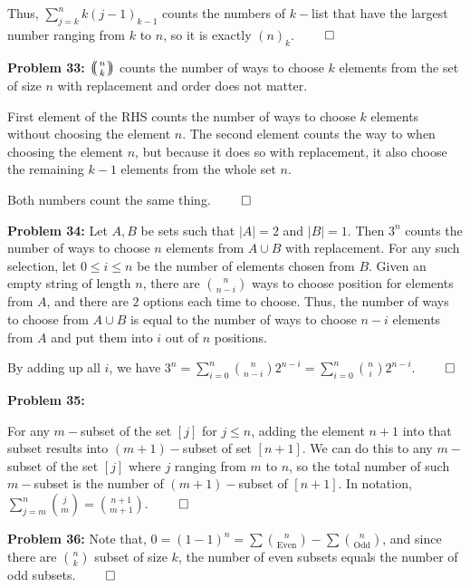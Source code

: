 \documentclass[12pt]{article}
\def\multiset#1#2{\ensuremath{\left(\kern-.3em\left(\genfrac{}{}{0pt}{}{#1}{#2}\right)\kern-.3em\right)}}
\newcommand{\prob}[1]{\textbf{Problem #1:}}
\begin{document}
Thus, $\sum\limits^{n}_{j=k} k(j-1)_{k-1}$ counts the numbers of $k-$list that have the largest number ranging from $k$ to $n$, so it is exactly $(n)_k$. $\qed$

\prob{33} $\multiset{n}{k}$ counts the number of ways to choose $k$ elements from the set of size $n$ with replacement and order does not matter.

First element of the RHS counts the number of ways to choose $k$ elements without choosing the element $n$. The second element counts the way to when choosing the element $n$, but because it does so with replacement, it also choose the remaining $k-1$ elements from the whole set $n$.

Both numbers count the same thing. $\qed$

\prob{34} Let $A,B$ be sets such that $|A| = 2$ and $|B| = 1$. Then $3^n$ counts the number of ways to choose $n$ elements from $A \cup B$ with replacement. For any such selection, let $0 \le i \le n$ be the number of elements chosen from $B$. Given an empty string of length $n$, there are $\binom{n}{n-i}$ ways to choose position for elements from $A$, and there are $2$ options each time to choose. Thus, the number of ways to choose from $A\cup B$ is equal to the number of ways to choose $n-i$ elements from $A$ and put them into $i$ out of $n$ positions. 

By adding up all $i$, we have $3^n = \sum\limits^n_{i=0} \binom{n}{n-i} 2^{n-i} =\sum\limits^n_{i=0} \binom{n}{i} 2^{n-i} $. $\qed$

\prob{35}

For any $m-$subset of the set $[j]$ for $j \le n$, adding the element $n+1$ into that subset results into $(m+1)-$subset of set $[n+1]$. We can do this to any $m-$subset of the set $[j]$ where $j$ ranging from $m$ to $n$, so the total number of such $m-$subset is the number of $(m+1)-$subset of $[n+1]$. In notation, $\sum\limits^n_{j=m} \binom{j}{m} = \binom{n+1}{m+1}$. $\qed$

\prob{36} Note that, $0 = (1-1)^n = \sum \binom{n}{\text{Even}} - \sum\binom{n}{\text{Odd}}$, and since there are $\binom{n}{k}$ subset of size $k$, the number of even subsets equals the number of odd subsets. $\qed$
\end{document}
